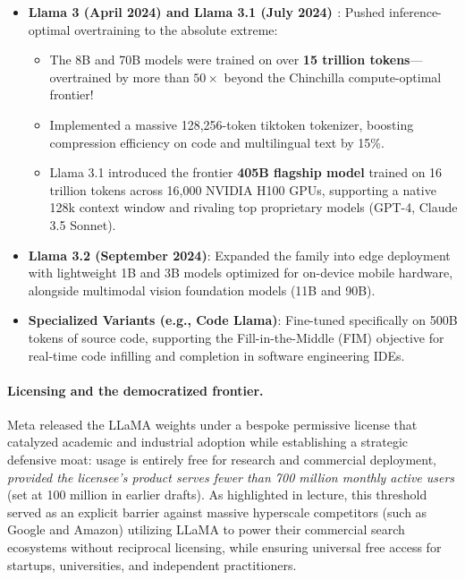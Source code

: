 \documentclass[../../main.tex]{subfiles}
\begin{document}
\begin{itemize}
    \item \textbf{Llama 3 (April 2024) and Llama 3.1 (July 2024) \cite{dubey2024llama3}}:
    Pushed inference-optimal overtraining to the absolute extreme:
    \begin{itemize}
        \item The 8B and 70B models were trained on over \textbf{15 trillion tokens}---overtrained by more than $50\times$ beyond the Chinchilla compute-optimal frontier!
        \item Implemented a massive 128,256-token tiktoken tokenizer, boosting compression efficiency on code and multilingual text by 15\%.
        \item Llama 3.1 introduced the frontier \textbf{405B flagship model} trained on 16 trillion tokens across 16,000 NVIDIA H100 GPUs, supporting a native 128k context window and rivaling top proprietary models (GPT-4, Claude 3.5 Sonnet).
    \end{itemize}

    \item \textbf{Llama 3.2 (September 2024)}:
    Expanded the family into edge deployment with lightweight 1B and 3B models optimized for on-device mobile hardware, alongside multimodal vision foundation models (11B and 90B).
    
    \item \textbf{Specialized Variants (e.g., Code Llama)}:
    Fine-tuned specifically on 500B tokens of source code, supporting the Fill-in-the-Middle (FIM) objective for real-time code infilling and completion in software engineering IDEs.
\end{itemize}

\paragraph{Licensing and the democratized frontier.}
Meta released the LLaMA weights under a bespoke permissive license that catalyzed academic and industrial adoption while establishing a strategic defensive moat: usage is entirely free for research and commercial deployment, \emph{provided the licensee's product serves fewer than 700 million monthly active users} (set at 100 million in earlier drafts). As highlighted in lecture, this threshold served as an explicit barrier against massive hyperscale competitors (such as Google and Amazon) utilizing LLaMA to power their commercial search ecosystems without reciprocal licensing, while ensuring universal free access for startups, universities, and independent practitioners.
\end{document}
